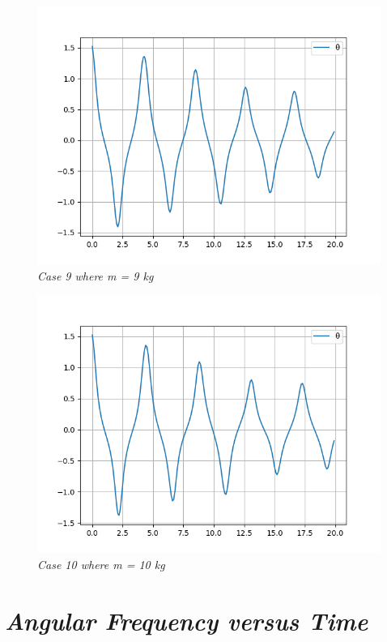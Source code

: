         \begin{figure}[H]
            \centering
            \includegraphics{Appendix/RExpPictures/A/am9.png}
            \caption{\textit{Case 9 where m = 9 kg}}
            \label{}
        \end{figure}
            
        \begin{figure}[H]
            \centering
            \includegraphics{Appendix/RExpPictures/A/am10.png}
            \caption{\textit{Case 10 where m = 10 kg}}
            \label{}
        \end{figure}
            
    \section{\textit{Angular Frequency versus Time}}
            
